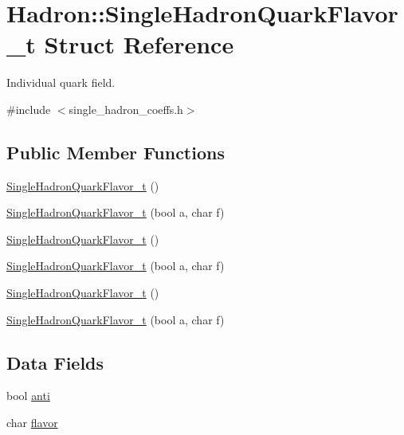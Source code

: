 \hypertarget{structHadron_1_1SingleHadronQuarkFlavor__t}{}\section{Hadron\+:\+:Single\+Hadron\+Quark\+Flavor\+\_\+t Struct Reference}
\label{structHadron_1_1SingleHadronQuarkFlavor__t}


Individual quark field.  




{\ttfamily \#include $<$single\+\_\+hadron\+\_\+coeffs.\+h$>$}

\subsection*{Public Member Functions}
\begin{DoxyCompactItemize}
\item 
\mbox{\hyperlink{structHadron_1_1SingleHadronQuarkFlavor__t_aa17c3ca156d9ab634b766a1e4e18b8a1}{Single\+Hadron\+Quark\+Flavor\+\_\+t}} ()
\item 
\mbox{\hyperlink{structHadron_1_1SingleHadronQuarkFlavor__t_a89bedb0d035a5df4cdcfd4657cd7ffe2}{Single\+Hadron\+Quark\+Flavor\+\_\+t}} (bool a, char f)
\item 
\mbox{\hyperlink{structHadron_1_1SingleHadronQuarkFlavor__t_aa17c3ca156d9ab634b766a1e4e18b8a1}{Single\+Hadron\+Quark\+Flavor\+\_\+t}} ()
\item 
\mbox{\hyperlink{structHadron_1_1SingleHadronQuarkFlavor__t_a89bedb0d035a5df4cdcfd4657cd7ffe2}{Single\+Hadron\+Quark\+Flavor\+\_\+t}} (bool a, char f)
\item 
\mbox{\hyperlink{structHadron_1_1SingleHadronQuarkFlavor__t_aa17c3ca156d9ab634b766a1e4e18b8a1}{Single\+Hadron\+Quark\+Flavor\+\_\+t}} ()
\item 
\mbox{\hyperlink{structHadron_1_1SingleHadronQuarkFlavor__t_a89bedb0d035a5df4cdcfd4657cd7ffe2}{Single\+Hadron\+Quark\+Flavor\+\_\+t}} (bool a, char f)
\end{DoxyCompactItemize}
\subsection*{Data Fields}
\begin{DoxyCompactItemize}
\item 
bool \mbox{\hyperlink{structHadron_1_1SingleHadronQuarkFlavor__t_a53359c8f3cd7263a4cfa843fb03c83ee}{anti}}
\item 
char \mbox{\hyperlink{structHadron_1_1SingleHadronQuarkFlavor__t_a1a2a95305c9eb98e74a72c281a4cd36c}{flavor}}
\end{DoxyCompactItemize}


